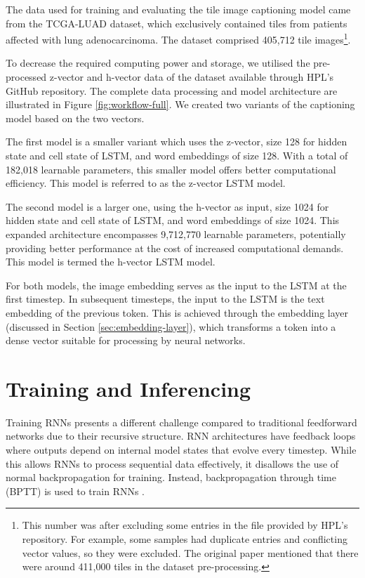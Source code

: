 \documentclass{l4proj}
\begin{document}
The data used for training and evaluating the tile image captioning model came from the TCGA-LUAD dataset, which exclusively contained tiles from patients affected with lung adenocarcinoma. The dataset comprised 405,712 tile images\footnote{This number was after excluding some entries in the file provided by HPL's repository. For example, some samples had duplicate entries and conflicting vector values, so they were excluded. The original paper mentioned that there were around 411,000 tiles in the dataset pre-processing.}.

To decrease the required computing power and storage, we utilised the pre-processed z-vector and h-vector data of the dataset available through HPL's GitHub repository. The complete data processing and model architecture are illustrated in Figure \ref{fig:workflow-full}. We created two variants of the captioning model based on the two vectors.

The first model is a smaller variant which uses the z-vector, size 128 for hidden state and cell state of LSTM, and word embeddings of size 128. With a total of 182,018 learnable parameters, this smaller model offers better computational efficiency. This model is referred to as the z-vector LSTM model.

The second model is a larger one, using the h-vector as input, size 1024 for hidden state and cell state of LSTM, and word embeddings of size 1024. This expanded architecture encompasses 9,712,770 learnable parameters, potentially providing better performance at the cost of increased computational demands. This model is termed the h-vector LSTM model.

For both models, the image embedding serves as the input to the LSTM at the first timestep. In subsequent timesteps, the input to the LSTM is the text embedding of the previous token. This is achieved through the embedding layer (discussed in Section \ref{sec:embedding-layer}), which transforms a token into a dense vector suitable for processing by neural networks. 

\section{Training and Inferencing} \label{sec:caption-training}
Training RNNs presents a different challenge compared to traditional feedforward networks due to their recursive structure. RNN architectures have feedback loops where outputs depend on internal model states that evolve every timestep. While this allows RNNs to process sequential data effectively, it disallows the use of normal backpropagation for training. Instead, backpropagation through time (BPTT) is used to train RNNs \citep{bptt}.
\end{document}
